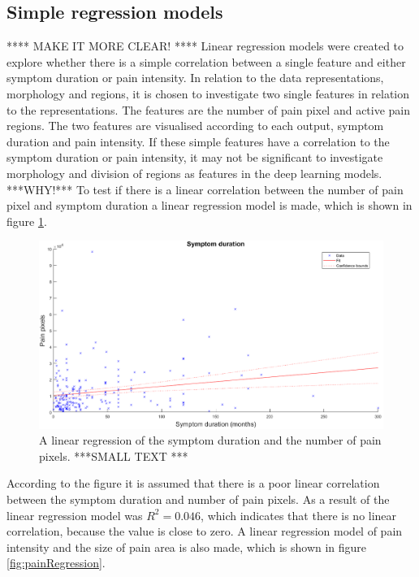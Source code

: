 \subsection{Simple regression models}
**** MAKE IT MORE CLEAR! ****
Linear regression models were created to explore whether there is a simple correlation between a single feature and either symptom duration or pain intensity. In relation to the data representations, morphology and regions, it is chosen to investigate two single features in relation to the representations. The features are the number of pain pixel and active pain regions. The two features are visualised according to each output, symptom duration and pain intensity.
If these simple features have a correlation to the symptom duration or pain intensity, it may not be significant to investigate morphology and division of regions as features in the deep learning models. ***WHY!***
\noindent
To test if there is a linear correlation between the number of pain pixel and symptom duration a linear regression model is made, which is shown in figure \ref{fig:durationRegression}. 
\newline

\begin{figure} [H]
\centering
\includegraphics[width=1\textwidth]{figures/durationRegression}
\caption{A linear regression of the symptom duration and the number of pain pixels. ***SMALL TEXT ***}
\label{fig:durationRegression}
\end{figure}

\noindent
According to the figure it is assumed that there is a poor linear correlation between the symptom duration and number of pain pixels. As a result of the linear regression model was $R^2=0.046$, which indicates that there is no linear correlation, because the value is close to zero.\newline
\noindent
A linear regression model of pain intensity and the size of pain area is also made, which is shown in figure \ref{fig:painRegression}. \newline


